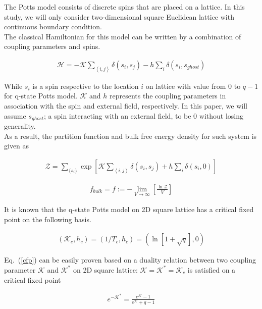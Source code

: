 \documentclass[%
 reprint,
 amsmath,amssymb,
 aps,
]{revtex4-2}
\begin{document}
The Potts model consists of discrete spins that are placed on a lattice. In this study, 
we will only consider two-dimensional square Euclidean lattice with continuous boundary 
condition. \\

The classical Hamiltonian for this model can be written by a combination of coupling 
parameters and spins.

\begin{eqnarray}
\mathcal{H} = -\mathcal{K} \sum_{\left<i,j\right>} \delta(s_{i}, s_{j}) - h \sum_{i} 
\delta(s_{i},s_{ghost}) \label{ham}
\end{eqnarray}

While $s_{i}$ is a spin respective to the location $i$ on lattice with value from $0$ to 
$q-1$ for q-state Potts model. $\mathcal{K}$ and $h$ represents the coupling parameters 
in association with the spin and external field, respectively. In this paper, we will 
assume $s_{ghost}$; a spin interacting with an external field, to be $0$ without losing 
generality. \\

As a result, the partition function and bulk free energy density for such system is 
given as

\begin{eqnarray}
\mathcal{Z} = \sum_{\{s_{i}\}} \exp \left[{\mathcal{K}}\sum_{\left<i,j\right>}
\delta(s_{i},s_{j}) + h \sum_{i} \delta(s_{i},0)\right] \label{par}
\end{eqnarray}

\begin{eqnarray}
f_{bulk} = f := - \lim_{V \rightarrow \infty} \left[\frac{\ln \mathcal{Z}}{V}
\right] \label{free}
\end{eqnarray}

It is known that the q-state Potts model on 2D square lattice has a critical fixed point 
on the following basis.

\begin{eqnarray}
\left(\mathcal{K}_{c}, h_{c} \right) = \left(1 / T_{c}, h_{c}\right) = 
\left(\ln[1+\sqrt q], 0 \right) \label{cfp}
\end{eqnarray}

Eq.~(\ref{cfp}) can be easily proven based on a duality relation between two coupling 
parameter $\mathcal{K}$ and $\mathcal{K}^{*}$ on 2D square lattice: 
$\mathcal{K} = \mathcal{K}^{*} = \mathcal{K}_{c}$ is satisfied on a critical fixed point

\begin{eqnarray}
e^{-\mathcal{K}^{*}} = \frac{e^{\mathcal{K}} - 1}{e^{\mathcal{K}} + q - 1}
\end{eqnarray}
\end{document}

